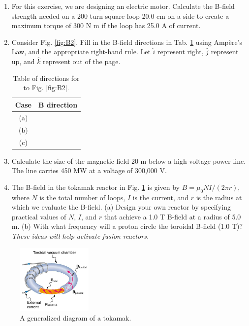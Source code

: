 \documentclass[12pt,twocolumn]{article}
\begin{document}
\begin{enumerate}
\item For this exercise, we are designing an electric motor.  Calculate the B-field strength needed on a 200-turn square loop 20.0 cm on a side to create a maximum torque of 300 N m if the loop has 25.0 A of current.  \\ \vspace{5cm}
\item Consider Fig. \ref{fig:B2}.  Fill in the B-field directions in Tab. \ref{tab:ex2} using Amp\`{e}re's Law, and the appropriate right-hand rule. Let $\hat{i}$ represent right, $\hat{j}$ represent up, and $\hat{k}$ represent out of the page.
\begin{table}
\centering
\begin{tabular}{| c | c |}
\hline
Case & B direction \\ \hline
(a) & \\ \hline
(b) & \\ \hline
(c) & \\ \hline
\end{tabular}
\caption{\label{tab:ex2} Table of directions for to Fig. \ref{fig:B2}.}
\end{table}
\item Calculate the size of the magnetic field 20 m below a high voltage power line. The line carries 450 MW at a voltage of 300,000 V. \\ \vspace{3cm}
\item The B-field in the tokamak reactor in Fig. \ref{fig:B3} is given by $B = \mu_0 N I / (2\pi r)$, where $N$ is the total number of loops, $I$ is the current, and $r$ is the radius at which we evaluate the B-field.  (a) Design your own reactor by specifying practical values of $N$, $I$, and $r$ that achieve a 1.0 T B-field at a radius of 5.0 m.  (b) With what frequency will a proton circle the toroidal B-field (1.0 T)?  \textit{These ideas will help activate fusion reactors.}
\end{enumerate}
\begin{figure}[hb]
\centering
\includegraphics[width=0.33\textwidth]{tokamak.png}
\caption{\label{fig:B3} A generalized diagram of a tokamak.}
\end{figure}
\end{document}

